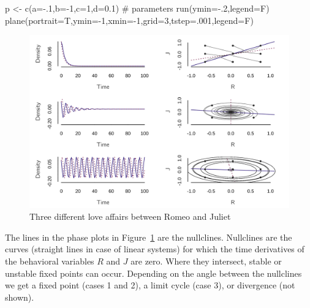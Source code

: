 \documentclass[
  a4paper,
  DIV=11,
  numbers=noendperiod,
  oneside]{scrreprt}
\newenvironment{Shaded}{\begin{snugshade}}{\end{snugshade}}
\newcommand{\AttributeTok}[1]{\textcolor[rgb]{0.40,0.45,0.13}{#1}}
\newcommand{\CommentTok}[1]{\textcolor[rgb]{0.37,0.37,0.37}{#1}}
\newcommand{\DecValTok}[1]{\textcolor[rgb]{0.68,0.00,0.00}{#1}}
\newcommand{\FloatTok}[1]{\textcolor[rgb]{0.68,0.00,0.00}{#1}}
\newcommand{\FunctionTok}[1]{\textcolor[rgb]{0.28,0.35,0.67}{#1}}
\newcommand{\NormalTok}[1]{\textcolor[rgb]{0.00,0.23,0.31}{#1}}
\newcommand{\OtherTok}[1]{\textcolor[rgb]{0.00,0.23,0.31}{#1}}
\newcommand{\SpecialCharTok}[1]{\textcolor[rgb]{0.37,0.37,0.37}{#1}}
\begin{document}
\begin{Shaded}
\begin{Highlighting}[]
\NormalTok{p }\OtherTok{\textless{}{-}} \FunctionTok{c}\NormalTok{(}\AttributeTok{a=}\SpecialCharTok{{-}}\NormalTok{.}\DecValTok{1}\NormalTok{,}\AttributeTok{b=}\SpecialCharTok{{-}}\DecValTok{1}\NormalTok{,}\AttributeTok{c=}\DecValTok{1}\NormalTok{,}\AttributeTok{d=}\FloatTok{0.1}\NormalTok{) }\CommentTok{\# parameters}
\FunctionTok{run}\NormalTok{(}\AttributeTok{ymin=}\SpecialCharTok{{-}}\NormalTok{.}\DecValTok{2}\NormalTok{,}\AttributeTok{legend=}\NormalTok{F)}
\FunctionTok{plane}\NormalTok{(}\AttributeTok{portrait=}\NormalTok{T,}\AttributeTok{ymin=}\SpecialCharTok{{-}}\DecValTok{1}\NormalTok{,}\AttributeTok{xmin=}\SpecialCharTok{{-}}\DecValTok{1}\NormalTok{,}\AttributeTok{grid=}\DecValTok{3}\NormalTok{,}\AttributeTok{tstep=}\NormalTok{.}\DecValTok{001}\NormalTok{,}\AttributeTok{legend=}\NormalTok{F)}
\end{Highlighting}
\end{Shaded}

\begin{figure}

{\centering \includegraphics{media/ch4n/fig-ch4n-img9-old-57.png}

}

\caption{\label{fig-ch4n-img9-old-57}Three different love affairs
between Romeo and Juliet}

\end{figure}

The lines in the phase plots in Figure~\ref{fig-ch4n-img9-old-57} are
the nullclines. Nullclines are the curves (straight lines in case of
linear systems) for which the time derivatives of the behavioral
variables \(R\) and \(J\) are zero. Where they intersect, stable or
unstable fixed points can occur. Depending on the angle between the
nullclines we get a fixed point (cases 1 and 2), a limit cycle (case 3),
or divergence (not shown).
\end{document}
